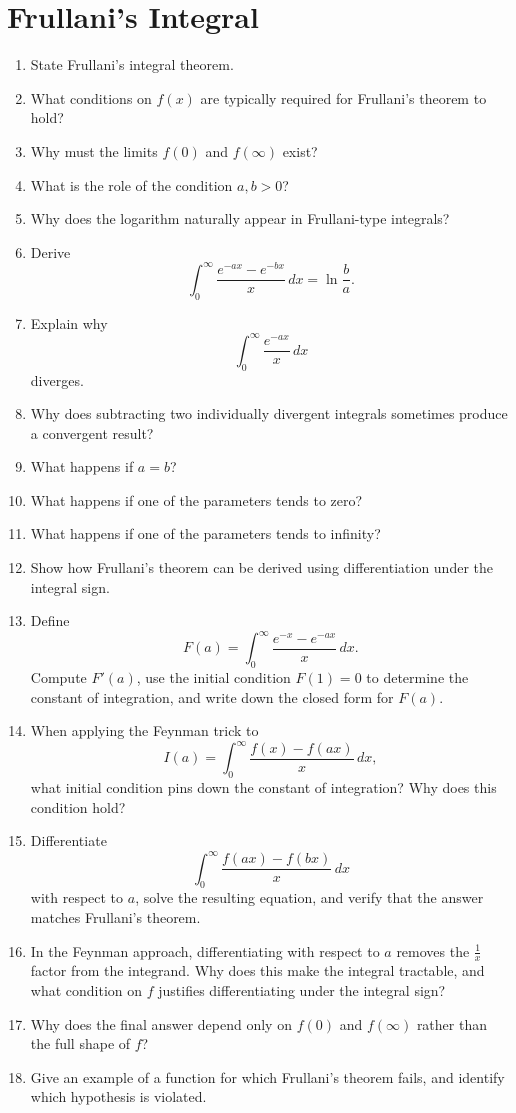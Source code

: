 \section{Frullani's Integral}

\begin{enumerate}

  \item State Frullani's integral theorem.
  \item What conditions on \(f(x)\) are typically required for Frullani's theorem to hold?
  \item Why must the limits \(f(0)\) and \(f(\infty)\) exist?
  \item What is the role of the condition \(a,b>0\)?
  \item Why does the logarithm naturally appear in Frullani-type integrals?
  \item Derive
    \[ \int_{0}^{\infty} \frac{e^{-ax}- e^{-bx}}{x}\,dx = \ln\frac{b}{a}. \]
  \item Explain why
    \[ \int_{0}^{\infty} \frac{e^{-ax}}{x}\,dx \]
    diverges.
  \item Why does subtracting two individually divergent integrals sometimes produce a convergent result?


  \item What happens if \(a = b\)?
  \item What happens if one of the parameters tends to zero?
  \item What happens if one of the parameters tends to infinity?


  \item Show how Frullani's theorem can be derived using differentiation under the integral sign.
  \item Define
    \[ F(a) = \int_{0}^{\infty} \frac{e^{-x}- e^{-ax}}{x}\,dx. \]
    Compute \(F'(a)\), use the initial condition \(F(1) = 0\) to determine the constant of integration, and write down the closed form for \(F(a)\).
  \item When applying the Feynman trick to
    \[ I(a) = \int_{0}^{\infty} \frac{f(x) - f(ax)}{x}\,dx, \]
    what initial condition pins down the constant of integration? Why does this condition hold?
  \item Differentiate
    \[ \int_{0}^{\infty} \frac{f(ax) - f(bx)}{x}\,dx \]
    with respect to \(a\), solve the resulting equation, and verify that the answer matches Frullani's theorem.
  \item In the Feynman approach, differentiating with respect to \(a\) removes the \(\tfrac{1}{x}\) factor from the integrand. Why does this make the integral tractable, and what condition on \(f\) justifies differentiating under the integral sign?
  \item Why does the final answer depend only on \(f(0)\) and \(f(\infty)\) rather than the full shape of \(f\)?
  \item Give an example of a function for which Frullani's theorem fails, and identify which hypothesis is violated.


\end{enumerate}
